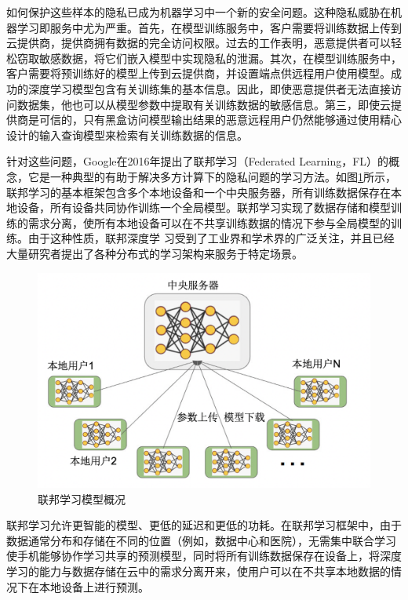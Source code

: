 如何保护这些样本的隐私已成为机器学习中一个新的安全问题。这种隐私威胁在机器学习即服务中尤为严重。首先，在模型训练服务中，客户需要将训练数据上传到云提供商，提供商拥有数据的完全访问权限。过去的工作表明，恶意提供者可以轻松窃取敏感数据，将它们嵌入模型中实现隐私的泄漏。其次，在模型训练服务中，客户需要将预训练好的模型上传到云提供商，并设置端点供远程用户使用模型。成功的深度学习模型包含有关训练集的基本信息。因此，即使恶意提供者无法直接访问数据集，他也可以从模型参数中提取有关训练数据的敏感信息。第三，即使云提供商是可信的，只有黑盒访问模型输出结果的恶意远程用户仍然能够通过使用精心设计的输入查询模型来检索有关训练数据的信息。

针对这些问题，Google在2016年提出了联邦学习（Federated Learning，FL）的概念，它是一种典型的有助于解决多方计算下的隐私问题的学习方法。如图\ref{fig:联邦学习模型概况}所示，联邦学习的基本框架包含多个本地设备和一个中央服务器，所有训练数据保存在本地设备，所有设备共同协作训练一个全局模型。联邦学习实现了数据存储和模型训练的需求分离，使所有本地设备可以在不共享训练数据的情况下参与全局模型的训练。由于这种性质，联邦深度学 习受到了工业界和学术界的广泛关注，并且已经大量研究者提出了各种分布式的学习架构来服务于特定场景。

\begin{figure}[!hbt]
\centering
	\includegraphics[scale=0.5]{fig2/C1/联邦学习}%
	\caption{联邦学习模型概况}
	\label{fig:联邦学习模型概况}	
\end{figure}

联邦学习允许更智能的模型、更低的延迟和更低的功耗。在联邦学习框架中，由于数据通常分布和存储在不同的位置（例如，数据中心和医院），无需集中联合学习使手机能够协作学习共享的预测模型，同时将所有训练数据保存在设备上，将深度学习的能力与数据存储在云中的需求分离开来，使用户可以在不共享本地数据的情况下在本地设备上进行预测。

